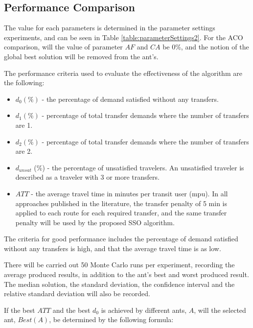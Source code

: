 \subsection{Performance Comparison}
\label{subsec:performanceComparison_setup}

The value for each parameters is determined in the parameter settings experiments, and can be seen in Table \vref{table:parameterSettings2}. For the ACO comparison, will the value of parameter $AF$ and $CA$ be 0\%, and the notion of the global best solution will be removed from the ant's. 

The performance criteria used to evaluate the effectiveness of the algorithm are the following:
\begin{itemize}
\item $d_0 (\%)$ - the percentage of demand satisfied without any transfers. 
\item $d_1 (\%)$ - percentage of total transfer demands where the number of transfers are 1. 
\item $d_2 (\%)$ - percentage of total transfer demands where the number of transfers are 2. 
\item $d_{unsat}$ (\%) - the percentage of unsatisfied travelers. An unsatisfied traveler is described as a traveler with 3 or more transfers. 
\item $ATT$  - the average travel time in minutes per transit user (mpu). In all approaches published in the literature, the transfer penalty of 5 min is applied to each route for each required transfer, and the same transfer penalty will be used by the proposed SSO algorithm.
\end{itemize}
The criteria for good performance includes the percentage of demand satisfied without any transfers is high, and that the average travel time is as low.

There will be carried out 50 Monte Carlo runs per experiment, recording the average produced results, in addition to the ant's best and worst produced result. The median solution, the standard deviation, the confidence interval and the relative standard deviation will also be recorded.

If the best $ATT$ and the best $d_0$ is achieved by different ants, $A$, will the selected ant, $Best(A)$, be determined by the following formula:

